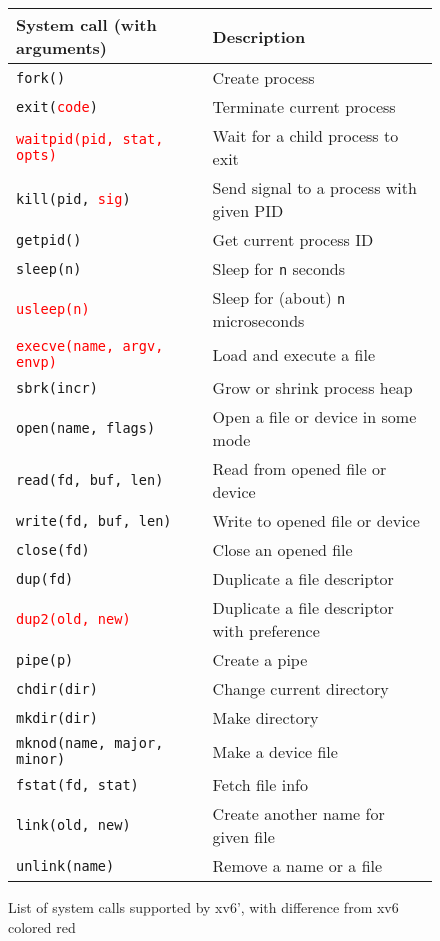 \documentclass{report}
\begin{document}
	\begin{figure}
		\centering
		\begin{tabular}{ll}
			System call (with arguments) & Description \\
			\hline
			\texttt{fork()} & Create process \\
			\texttt{exit(\textcolor{red}{code})} & Terminate current process \\
			\textcolor{red}{\texttt{waitpid(pid, stat, opts)}} & Wait for a child process to exit \\
			\texttt{kill(pid, \textcolor{red}{sig})} & Send signal to a process with given PID \\
			\texttt{getpid()} & Get current process ID \\
			\texttt{sleep(n)} & Sleep for \texttt{n} seconds \\
			\textcolor{red}{\texttt{usleep(n)}} & Sleep for (about) \texttt{n} microseconds \\
			\textcolor{red}{\texttt{execve(name, argv, envp)}} & Load and execute a file \\
			\texttt{sbrk(incr)} & Grow or shrink process heap \\
			\texttt{open(name, flags)} & Open a file or device in some mode \\
			\texttt{read(fd, buf, len)} & Read from opened file or device \\
			\texttt{write(fd, buf, len)} & Write to opened file or device \\
			\texttt{close(fd)} & Close an opened file \\
			\texttt{dup(fd)} & Duplicate a file descriptor \\
			\textcolor{red}{\texttt{dup2(old, new)}} & Duplicate a file descriptor with preference \\
			\texttt{pipe(p)} & Create a pipe \\
			\texttt{chdir(dir)} & Change current directory \\
			\texttt{mkdir(dir)} & Make directory \\
			\texttt{mknod(name, major, minor)} & Make a device file \\
			\texttt{fstat(fd, stat)} & Fetch file info \\
			\texttt{link(old, new)} & Create another name for given file \\
			\texttt{unlink(name)} & Remove a name or a file \\
		\end{tabular}
		\caption{List of system calls supported by xv6', with difference from xv6 colored red}
		\label{syscalls}
	\end{figure}
	
\end{document}
